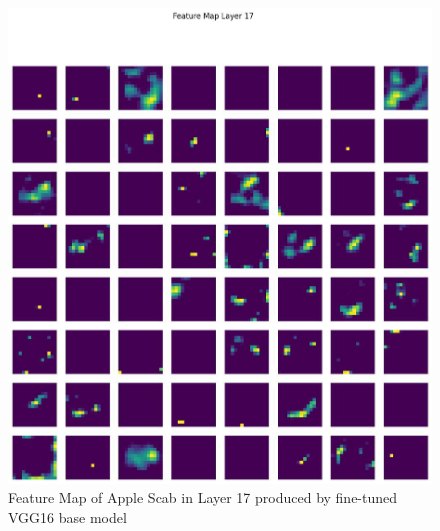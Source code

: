 \begin{figure}
    \centering
    \includegraphics[width=1\linewidth]{graphics//chapter7/abr fmap 17.png}
    \caption{Feature Map of Apple Scab in Layer 17 produced by fine-tuned VGG16 base model}
    \label{fig:abr-fmap5}
\end{figure}



